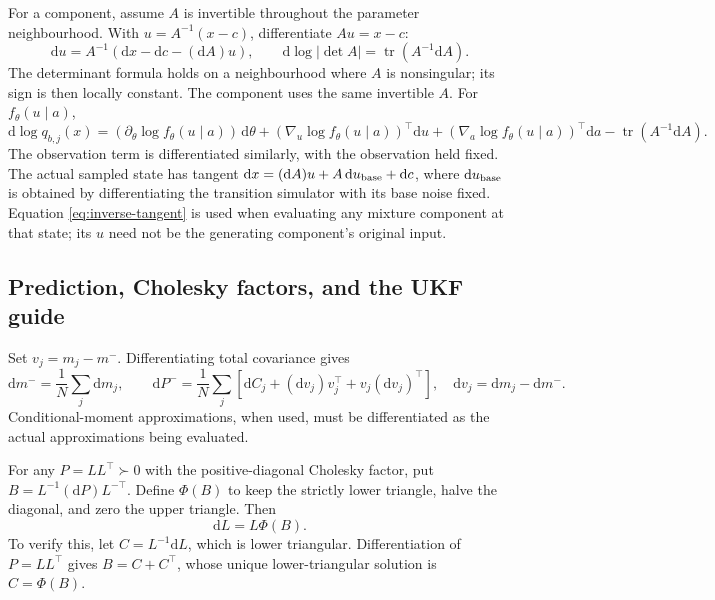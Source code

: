 \documentclass[11pt,a4paper]{article}
\newcommand{\tr}{\operatorname{tr}}
\newcommand{\dd}{\mathrm d}
\begin{document}
For a component, assume \(A\) is invertible throughout the
parameter neighbourhood. With \(u=A^{-1}(x-c)\), differentiate \(Au=x-c\):
\begin{equation}
\label{eq:inverse-tangent}
 \dd u=A^{-1}(\dd x-\dd c-(\dd A)u),\qquad
 \dd\log|\det A|=\tr(A^{-1}\dd A).
\end{equation}
The determinant formula holds on a neighbourhood where \(A\) is
nonsingular; its sign is then locally constant. The component uses the same invertible \(A\).
For \(f_\theta(u\mid a)\),
\begin{equation}
\label{eq:component-tangent}
 \dd\log q_{b,j}(x)
 =(\partial_\theta\log f_\theta(u\mid a))\,\dd\theta
  +(\nabla_u\log f_\theta(u\mid a))^\top\dd u
  +(\nabla_a\log f_\theta(u\mid a))^\top\dd a
  -\tr(A^{-1}\dd A).
\end{equation}
The observation term is differentiated similarly, with the observation
held fixed. The actual sampled state has tangent
\(\dd x=(\dd A)u+A\,\dd u_{\rm base}+\dd c\), where
\(\dd u_{\rm base}\) is obtained by differentiating the transition simulator
with its base noise fixed. Equation \eqref{eq:inverse-tangent} is used
when evaluating any mixture component at that state; its \(u\) need not
be the generating component's original input.

\subsection{Prediction, Cholesky factors, and the UKF guide}

Set \(v_j=m_j-m^-\). Differentiating total covariance gives
\begin{equation}
\label{eq:prediction-tangent}
 \dd m^-=\frac1N\sum_j\dd m_j,\qquad
 \dd P^-=\frac1N\sum_j\left[
 \dd C_j+(\dd v_j)v_j^\top+v_j(\dd v_j)^\top\right],
 \quad \dd v_j=\dd m_j-\dd m^-.
\end{equation}
Conditional-moment approximations, when used, must be differentiated as
the actual approximations being evaluated.

For any \(P=LL^\top\succ0\) with the positive-diagonal Cholesky factor,
put \(B=L^{-1}(\dd P)L^{-\top}\). Define \(\Phi(B)\) to keep the strictly
lower triangle, halve the diagonal, and zero the upper triangle. Then
\begin{equation}
\label{eq:chol-tangent}
 \dd L=L\Phi(B).
\end{equation}
To verify this, let \(C=L^{-1}\dd L\), which is lower triangular.
Differentiation of \(P=LL^\top\) gives \(B=C+C^\top\), whose unique
lower-triangular solution is \(C=\Phi(B)\).
\end{document}
